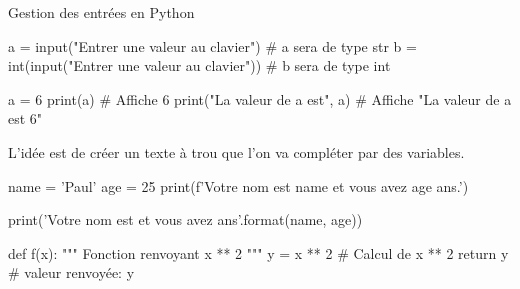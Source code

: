 \def\level{Première}  %
\def\course{NSI}
\def\chaptername{Les Fonctions} %
\def\docname{AP02-S}        %

\pagestyle{cours_FP}
\makeheader{} %

\begin{easybox}{Gestion des entrées en Python}
	\begin{CodePythontexAlt}[TaillePolice=\normalsize, Largeur=1\linewidth,Centre,PremLigne=1, Lignes=true,]{}
        a = input("Entrer une valeur au clavier")           # a sera de type str
        b = int(input("Entrer une valeur au clavier"))      # b sera de type int
    \end{CodePythontexAlt}

	\begin{CodePythontexAlt}[TaillePolice=\normalsize, Largeur=1\linewidth,Centre,PremLigne=1, Lignes=true,]{}
         a = 6
         print(a)  # Affiche 6
         print("La valeur de a est", a)  # Affiche "La valeur de a est 6"   
      \end{CodePythontexAlt}
\end{easybox}	

\begin{methode}{}

    L'idée est de créer un texte à trou que l'on va compléter par des variables.
		\begin{ConsolePythontex}[TaillePolice=\normalsize, Label=false]{}
    name = 'Paul'
    age = 25
    print(f'Votre nom est {name} et vous avez {age} ans.')
\end{ConsolePythontex}  

\begin{ConsolePythontex}[TaillePolice=\normalsize, Label=false]{}
    print('Votre nom est {} et vous avez {} ans'.format(name, age))
\end{ConsolePythontex}
\end{methode}


\begin{definition}{}

	\begin{CodePythontexAlt}[TaillePolice=\normalsize, Largeur=1\linewidth,Centre,PremLigne=1, Lignes=true,]{}
		def f(x):
			""" Fonction renvoyant x ** 2 """
			y = x ** 2		# Calcul de x ** 2
			return y  		# valeur renvoyée: y
		\end{CodePythontexAlt}
		
   \end{definition}


